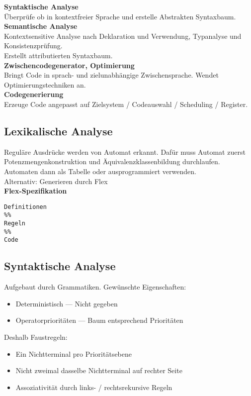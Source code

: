 \textbf{Syntaktische Analyse}\\
Überprüfe ob in kontextfreier Sprache und erstelle Abstrakten Syntaxbaum.\\

\textbf{Semantische Analyse}\\
Kontextsensitive Analyse nach Deklaration und Verwendung, Typanalyse und Konsistenzprüfung.\\
Erstellt attributierten Syntaxbaum.\\

\textbf{Zwischencodegenerator, Optimierung}\\
Bringt Code in sprach- und zielunabhängige Zwischensprache. Wendet Optimierungstechniken an.\\

\textbf{Codegenerierung}\\
Erzeuge Code angepasst auf Zielsystem / Codeauswahl / Scheduling / Register.

\subsection{Lexikalische Analyse}%
\label{cmp:sub:lexikalische-analyse}
Reguläre Ausdrücke werden von Automat erkannt. Dafür muss Automat zuerst Potenzmengenkonstruktion und
Äquivalenzklassenbildung durchlaufen.\\
Automaten dann als Tabelle oder ausprogrammiert verwenden.\\
Alternativ: Generieren durch Flex\\

\textbf{Flex-Spezifikation}
\begin{lstlisting}
Definitionen
%%
Regeln
%%
Code
\end{lstlisting}

\subsection{Syntaktische Analyse}%
\label{cmp:sub:syntaktische-analyse}
Aufgebaut durch Grammatiken. Gewünschte Eigenschaften:
\begin{itemize}
  \item Deterministisch --- Nicht gegeben
  \item Operatorprioritäten --- Baum entsprechend Prioritäten
\end{itemize}
Deshalb Faustregeln:
\begin{itemize}
  \item Ein Nichtterminal pro Prioritätsebene
  \item Nicht zweimal dasselbe Nichtterminal auf rechter Seite
  \item Assoziativität durch links- / rechtsrekursive Regeln
\end{itemize}


